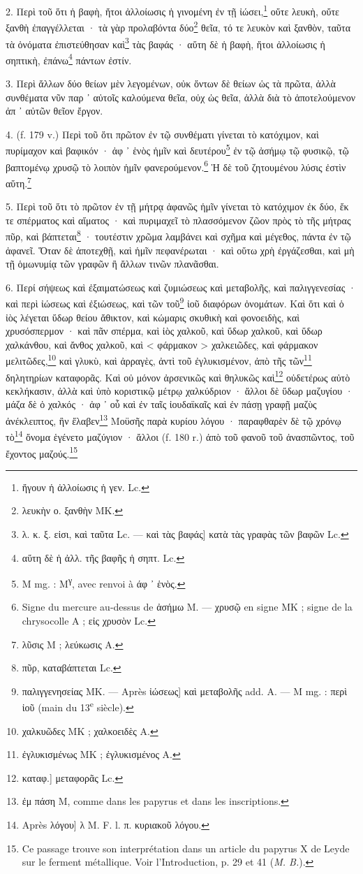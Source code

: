 \documentclass[a4paper, 11pt, oneside, polutonikogreek, french]{article}
\begin{document}
2. Περὶ τοῦ ὅτι ἡ βαφὴ, ἤτοι ἀλλοίωσις ἡ γινομένη ἐν τῇ ἰώσει,\footnote{ἤγουν ἡ ἀλλοίωσις ἡ γεν. Lc.} οὔτε λευκὴ, οὔτε ξανθὴ ἐπαγγέλλεται · τὰ γὰρ προλαβόντα δύο\footnote{λευκὴν ο. ξανθὴν MK.} θεῖα, τό τε λευκὸν καὶ ξανθὸν, ταῦτα τὰ ὀνόματα ἐπιστεύθησαν καὶ\footnote{λ. κ. ξ. εἰσι, καὶ ταῦτα Lc. --- καὶ τὰς βαφάς] κατὰ τὰς γραφὰς τῶν βαφῶν Lc.} τὰς βαφάς · αὕτη δὲ ἡ βαφὴ, ἤτοι ἀλλοίωσις ἡ σηπτικὴ, ἐπάνω\footnote{αὕτη δὲ ἡ ἀλλ. τῆς βαφῆς ἡ σηπτ. Lc.} πάντων ἐστίν.

3. Περὶ ἄλλων δύο θείων μὲν λεγομένων, οὐκ ὄντων δὲ θείων ὡς τὰ πρῶτα, ἀλλὰ συνθέματα νῦν παρ ᾽ αὐτοῖς καλούμενα θεῖα, οὐχ ὡς θεῖα, ἀλλὰ διὰ τὸ ἀποτελούμενον ἀπ ᾽ αὐτῶν θεῖον ἔργον.

4. (f. 179 v.) Περὶ τοῦ ὅτι πρῶτον ἐν τῷ συνθέματι γίνεται τὸ κατόχιμον, καὶ πυρίμαχον καὶ βαφικόν · ἀφ ᾽ ἑνὸς ἡμῖν καὶ δευτέρου\footnote{M mg. : M\textsuperscript{γ}, avec renvoi à άφ ᾽ ἑνὸς.} ἐν τῷ ἀσήμῳ τῷ φυσικῷ, τῷ βαπτομένῳ χρυσῷ τὸ λοιπὸν ἡμῖν φανερούμενον.\footnote{Signe du mercure au-dessus de ἀσήμω M. --- χρυσῷ en signe MΚ ; signe de la chrysocolle A ; εἰς χρυσὸν Lc.} Ἡ δὲ τοῦ ζητουμένου λύσις ἐστὶν αὕτη.\footnote{λῦσις M ; λεύκωσις A.}

5. Περὶ τοῦ ὅτι τὸ πρῶτον ἐν τῇ μήτρᾳ ἀφανῶς ἡμῖν γίνεται τὸ κατόχιμον ἐκ δύο, ἔκ τε σπέρματος καὶ αἵματος · καὶ πυριμαχεῖ τὸ πλασσόμενον ζῶον πρὸς τὸ τῆς μήτρας πῦρ, καὶ βάπτεται\footnote{πῦρ, καταβάπτεται Lc.} · τουτέστιν χρῶμα λαμβάνει καὶ σχῆμα καὶ μέγεθος, πάντα ἐν τῷ ἀφανεῖ. Ὅταν δὲ ἀποτεχθῇ, καὶ ἡμῖν πεφανέρωται · καὶ οὕτω χρὴ ἐργάζεσθαι, καὶ μὴ τῇ ὁμωνυμίᾳ τῶν γραφῶν ἢ ἄλλων τινῶν πλανᾶσθαι.

6. Περί σήψεως καὶ ἐξαιματώσεως καὶ ζυμιώσεως καὶ μεταβολῆς, καὶ παλιγγενεσίας · καὶ περὶ ἰώσεως καὶ ἐξιώσεως, καὶ τῶν τοῦ\footnote{παλιγγενησείας MK. --- Après ἰώσεως] καὶ μεταβολῆς add. A. --- M mg. : περὶ ἰοῦ (main du 13\textsuperscript{e} siècle).} ἰοῦ διαφόρων ὀνομάτων. Καὶ ὅτι καὶ ὁ ἰὸς λέγεται ὕδωρ θείου ἄθικτον, καὶ κώμαρις σκυθικὴ καὶ φονοειδὴς, καὶ χρυσόσπερμον · καὶ πᾶν σπέρμα, καὶ ἰὸς χαλκοῦ, καὶ ὕδωρ χαλκοῦ, καὶ ὕδωρ χαλκάνθου, καὶ ἄνθος χαλκοῦ, καὶ < φάρμακον > χαλκειῶδες, καὶ φάρμακον μελιτῶδες,\footnote{χαλκυῶδες MK ; χαλκοειδὲς A.} καὶ γλυκὺ, καὶ ἀρραγὲς, ἀντὶ τοῦ ἐγλυκισμένον, ἀπὸ τῆς τῶν\footnote{ἐγλυκισμένως MK ; ἐγλυκισμένος A.} δηλητηρίων καταφορᾶς. Καὶ οὐ μόνον ἀρσενικῶς καὶ θηλυκῶς καὶ\footnote{καταφ.] μεταφορᾶς Lc.} οὐδετέρως αὐτὸ κεκλήκασιν, ἀλλὰ καὶ ὑπὸ κοριστικῷ μέτρῳ χαλκύδριον · ἄλλοι δὲ ὕδωρ μαζυγίου · μάζα δὲ ὁ χαλκός · ἀφ ᾽ οὗ καὶ ἐν ταῖς ἰουδαϊκαῖς καὶ ἐν πάσῃ γραφῇ μαζὺς ἀνέκλειπτος, ἣν ἔλαβεν\footnote{ἐμ πάση M, comme dans les papyrus et dans les inscriptions.} Μοϋσῆς παρὰ κυρίου λόγου · παραφθαρὲν δὲ τῷ χρόνῳ τὸ\footnote{Après λόγου] λ M. F. l. π. κυριακοῦ λόγου.} ὄνομα ἑγένετο μαζύγιον · ἄλλοι (f. 180 r.) ἀπὸ τοῦ φανοῦ τοῦ ἀνασπῶντος, τοῦ ἔχοντος μαζούς.\footnote{Ce passage trouve son interprétation dans un article du papyrus X de Leyde sur le ferment métallique. Voir l'Introduction, p. 29 et 41 (\emph{M. B.}).}
\end{document}
